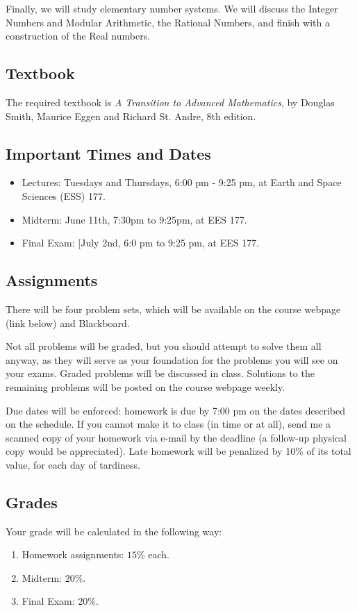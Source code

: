 \documentclass[11pt]{amsart}
\numberwithin{equation}{section}
\begin{document}
Finally, we will study elementary number systems. We will discuss the Integer Numbers and Modular Arithmetic, the Rational Numbers, and finish with a construction of the Real numbers.

\subsection{Textbook}
The required textbook is \textit{A Transition to Advanced Mathematics}, by Douglas Smith, Maurice Eggen and Richard St. Andre, 8th edition.

\subsection{Important Times and Dates}
\begin{itemize}
\item Lectures: Tuesdays and Thursdays, 6:00 pm - 9:25 pm, at Earth and Space Sciences (ESS) 177.
\item Midterm: June 11th, 7:30pm to 9:25pm, at EES 177.
\item Final Exam: [July 2nd, 6:0 pm to 9:25 pm, at EES 177.
\end{itemize}

\subsection{Assignments}
	There will be four problem sets, which will be available on the course webpage (link below) and Blackboard.
	
    Not all problems will be graded, but you should attempt to solve them all anyway, as they will serve as your foundation for the problems you will see on your exams. Graded problems will be discussed in class. Solutions to the remaining problems will be posted on the course webpage weekly.
    
    Due dates will be enforced: homework is due by 7:00 pm on the dates described on the schedule. If you cannot make it to class (in time or at all), send me a scanned copy of your homework via e-mail by the deadline (a follow-up physical copy would be appreciated). Late homework will be penalized by 10\% of its total value, for each day of tardiness.

\subsection{Grades}
Your grade will be calculated in the following way:
\begin{enumerate}
\item Homework assignments: $15\%$ each.
\item Midterm: $20\%$.
\item Final Exam: $20\%$.
\end{enumerate}
\end{document}
